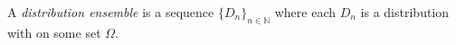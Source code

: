 \documentclass[12pt]{article}
\begin{document}
A \emph{distribution ensemble} is a sequence $\{D_n\}_{n\in \mathbb{N}}$ where each $D_n$ is a distribution with  on some set $\Omega$.
\end{document}
